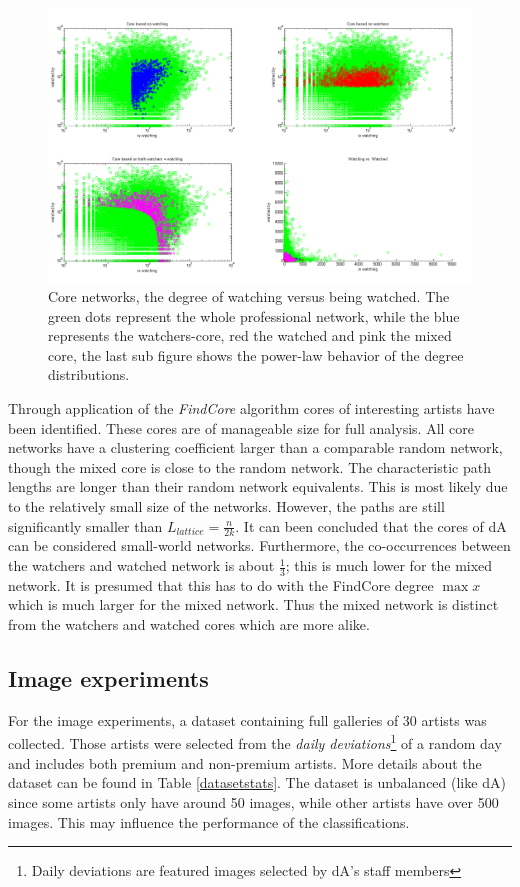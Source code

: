 \begin{figure}[htb]
  \centering
  \includegraphics[width=1\linewidth]{img/core.png}
  \caption{Core networks, the degree of watching versus being watched.  The green dots represent the whole professional network, while the blue represents the watchers-core, red the watched and pink the mixed core, the last sub figure shows the power-law behavior of the degree distributions.}
  \label{fig:results_core}
\end{figure}

Through application of the \textit{FindCore} algorithm cores of interesting artists have been identified. These cores are of manageable size for full analysis.  All core networks have a clustering coefficient larger than a comparable random network, though the mixed core is close to the random network. The characteristic path lengths are longer than their random network equivalents. This is most likely due to the relatively small size of the networks. However, the paths are still significantly smaller than $L_{lattice}=\frac{n}{2k}$. It can been concluded that the cores of dA can be considered small-world networks.  
Furthermore, the co-occurrences between the watchers and watched network is about $\frac{1}{3}$; this is much lower for the mixed network. It is presumed that this has to do with the FindCore degree $\max x$ which is much larger for the mixed network. Thus the mixed network is distinct from the watchers and watched cores which are more alike.

\subsection{Image experiments}
For the image experiments, a dataset containing full galleries of 30 artists was collected.
Those artists were selected from the \textit{daily deviations}\footnote{Daily deviations are featured images selected by dA's staff members} of a random day and includes both premium and non-premium artists. 
More details about the dataset can be found in Table \ref{datasetstats}. 
The dataset is unbalanced (like dA) since some artists only have around 50 images, while other artists have over 500 images. This may influence the performance of the classifications.



